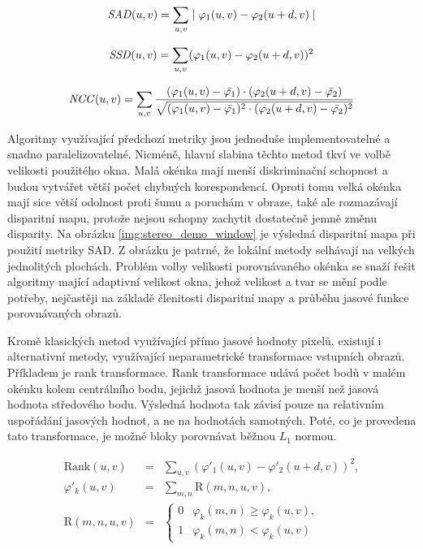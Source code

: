 \begin{equation}
    \label{e2}
	\mbox{\textit{SAD}}(u,v) =  \sum\limits_{u,v} \mid \varphi_{1}(u,v) - \varphi_{2}(u + d,v) \mid
\end{equation}

\begin{equation}
    \label{e1}
	\mbox{\textit{SSD}}(u,v) =  \sum\limits_{u,v} (\varphi_{1}(u,v) - \varphi_{2}(u + d,v))^2
\end{equation}

\begin{equation}
    \label{e3}
	\mbox{\textit{NCC}}(u,v) =  \sum\limits_{u,v} \frac{(\varphi_{1}(u,v) - \bar{\varphi_{1}}) \cdot (\varphi_{2}(u + d,v) - \bar{\varphi_{2}})}{\sqrt{(\varphi_{1}(u,v) - \bar{\varphi_{1}})^{2} \cdot (\varphi_{2}(u + d,v) - \bar{\varphi_{2}})^{2} } }
\end{equation}

Algoritmy využívající předchozí metriky jsou jednoduše implementovatelné a snadno paralelizovatelné. Nicméně, hlavní slabina těchto metod tkví ve volbě velikosti použitého okna. Malá okénka mají menší diskriminační schopnost a  budou vytvářet větší počet chybných korespondencí. Oproti tomu velká okénka mají sice větší odolnost proti šumu a poruchám v obraze, také ale rozmazávají disparitní mapu, protože nejsou schopny zachytit dostatečně jemně změnu disparity. Na obrázku \ref{img:stereo_demo_window} je výsledná disparitní mapa při použití metriky SAD. Z obrázku je patrné, že lokální metody selhávají na velkých jednolitých plochách. Problém volby velikosti porovnávaného okénka se snaží řešit algoritmy mající adaptivní velikost okna, jehož velikost a tvar se mění podle potřeby, nejčastěji na základě členitosti disparitní mapy a průběhu jasové funkce porovnávaných obrazů.

Kromě klasických metod využívající přímo jasové hodnoty pixelů, existují i alternativní metody, využívající neparametrické transformace vstupních obrazů. 
Příkladem je rank transformace. Rank transformace udává počet bodů v malém okénku kolem centrálního bodu, jejichž jasová hodnota je menší než jasová hodnota středového bodu. Výsledná hodnota tak závisí pouze na relativním uspořádání jasových hodnot, a ne na hodnotách samotných. Poté, co je provedena tato transformace, je možné bloky porovnávat běžnou $L_{1}$ normou.

\begin{eqnarray}
\mathrm{Rank}(u,v) &=&  \sum\limits_{u, v} (\varphi'_{1}(u,v) - \varphi'_{2}(u + d,v))^2, \\
\varphi'_{k}(u,v) &=& \sum\limits_{m, n} \mathrm{R}(m,n,u,v),\\
\mathrm{R}(m,n,u,v) &=& \left\{
\begin{array}{cc}
  0 & \varphi_{k}(m,n) \ge \varphi_{k}(u,v), \\
  1 & \varphi_{k}(m,n) < \varphi_{k}(u,v)
 \end{array}
 \right.
\end{eqnarray}

